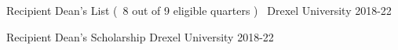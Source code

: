 



\begin{cvhonors}
  \cvhonor
    {Recipient} %
    {Dean's List (\ 8 out of 9 eligible quarters )\ } %
    {Drexel University} %
    {2018-22} %

  \cvhonor
    {Recipient} %
    {Dean's Scholarship} %
    {Drexel University} %
    {2018-22} %




\end{cvhonors}
